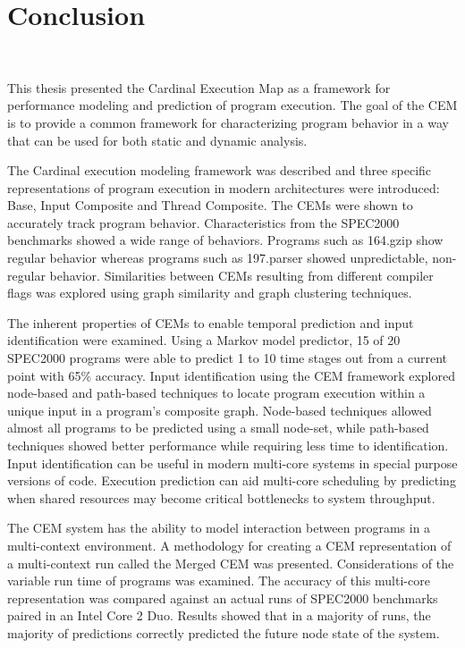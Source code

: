\chapter{Conclusion}~\label{chap:conclusion}

This thesis presented the Cardinal Execution Map as a framework for
performance modeling and prediction of program execution. The goal
of the CEM is to provide a common framework for characterizing program
behavior in a way that can be used for both static and dynamic
analysis.

The Cardinal execution modeling framework was described and three
specific representations of program execution in modern architectures
were introduced: Base, Input Composite and Thread Composite.
The CEMs were shown to accurately track program behavior.
Characteristics from the SPEC2000 benchmarks
showed a wide range of behaviors. Programs such as 164.gzip show
regular behavior whereas programs such as 197.parser showed
unpredictable, non-regular behavior. Similarities between CEMs
resulting from different compiler flags was explored using graph
similarity and graph clustering techniques.

The inherent properties of CEMs to enable temporal prediction and
input identification were examined. Using a Markov model predictor,
15 of 20 SPEC2000 programs were able to predict 1 to 10 time
stages out from a current point with 65\% accuracy. Input
identification using the CEM framework explored node-based and
path-based techniques to locate program execution within a unique
input in a program's composite graph. Node-based techniques
allowed almost all programs to be predicted using a small
node-set, while path-based techniques showed better performance
while requiring less time to identification. Input identification can be useful in
modern multi-core systems in special purpose versions of code.
Execution prediction can aid multi-core scheduling by predicting when
shared resources may become critical bottlenecks to system throughput.

The CEM system has the ability to model interaction between programs
in a multi-context environment. A methodology for creating a CEM
representation of a multi-context run called the Merged CEM was presented.
Considerations of
the variable run time of programs was examined. The accuracy of this
multi-core representation was compared against an actual runs of
SPEC2000 benchmarks paired in an Intel Core 2 Duo. Results showed that in a
majority of runs, the majority of predictions correctly predicted the future
node state of the system.

